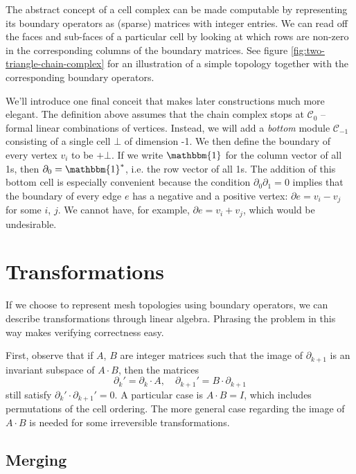 \documentclass[twocolumn]{article}
\begin{document}
The abstract concept of a cell complex can be made computable by representing its boundary operators as (sparse) matrices with integer entries.
We can read off the faces and sub-faces of a particular cell by looking at which rows are non-zero in the corresponding columns of the boundary matrices.
See figure \ref{fig:two-triangle-chain-complex} for an illustration of a simple topology together with the corresponding boundary operators.

We'll introduce one final conceit that makes later constructions much more elegant.
The definition above assumes that the chain complex stops at $\mathscr{C}_0$ -- formal linear combinations of vertices.
Instead, we will add a \emph{bottom} module $\mathscr{C}_{-1}$ consisting of a single cell $\bot$ of dimension -1.
We then define the boundary of every vertex $v_i$ to be $+\bot$.
If we write $\mathbbm{1}$ for the column vector of all 1s, then $\partial_0 = \mathbbm{1}^*$, i.e. the row vector of all 1s.
The addition of this bottom cell is especially convenient because the condition $\partial_0\partial_1 = 0$ implies that the boundary of every edge $e$ has a negative and a positive vertex: $\partial e = v_i - v_j$ for some $i$, $j$.
We cannot have, for example, $\partial e = v_i + v_j$, which would be undesirable.


\section{Transformations}

If we choose to represent mesh topologies using boundary operators, we can describe transformations through linear algebra.
Phrasing the problem in this way makes verifying correctness easy.

First, observe that if $A$, $B$ are integer matrices such that the image of $\partial_{k + 1}$ is an invariant subspace of $A\cdot B$, then the matrices
\begin{equation}
    \partial_k' = \partial_k\cdot A, \quad \partial_{k + 1}' = B\cdot\partial_{k + 1}
\end{equation}
still satisfy $\partial_k'\cdot\partial_{k + 1}' = 0$.
A particular case is $A\cdot B = I$, which includes permutations of the cell ordering.
The more general case regarding the image of $A\cdot B$ is needed for some irreversible transformations.

\subsection{Merging}
\end{document}
